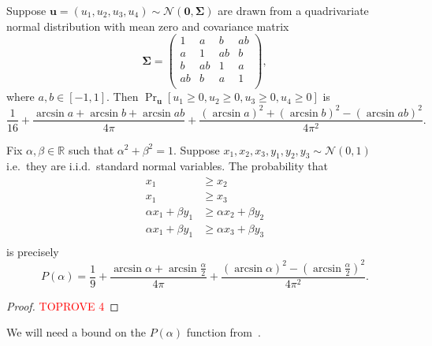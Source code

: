 \documentclass[a4paper,11pt, DIV=11]{scrartcl}
\theoremstyle{plain}
\theoremstyle{definition}
\begin{document}
\begin{theorem}\label{thm:cheng}
Suppose $\mathbf{u} = (u_1, u_2, u_3, u_4) \sim \mathcal{N}(\mathbf{0}, \mathbf{\Sigma})$ are drawn from a quadrivariate normal distribution with mean zero and covariance matrix
\[
\mathbf{\Sigma} =
\begin{pmatrix}
   1 & a & b & ab \\
   a & 1 & ab & b \\
   b & ab & 1 & a \\
   ab & b & a & 1 \\
\end{pmatrix},
\]
where $a, b \in [-1, 1]$. Then $\Pr_{\mathbf{u}}[u_1 \geq 0, u_2 \geq 0, u_3 \geq 0, u_4 \geq 0]$ is 
\[
\frac{1}{16} + \frac{\arcsin a + \arcsin b + \arcsin ab}{4\pi} + \frac{{(\arcsin a)}^2 + {(\arcsin b)}^2 - {(\arcsin ab)}^2}{4\pi^2}.
\]
\end{theorem}

\begin{lemma}\label{lem:prExpr}
Fix $\alpha, \beta \in \mathbb{R}$ such that $\alpha^2 + \beta^2 = 1$. Suppose $x_1, x_2, x_3, y_1, y_2, y_3 \sim \mathcal{N}(0, 1)$ i.e.~they are i.i.d.~standard normal variables. The probability that
\begin{align*}
x_1 & \geq x_2 \\
x_1 & \geq x_3 \\
\alpha x_1 + \beta y_1 & \geq  \alpha x_2 + \beta y_2 \\
\alpha x_1 + \beta y_1 & \geq  \alpha x_3 + \beta y_3 \\
\end{align*}
is precisely
\[
P(\alpha) = 
\frac{1}{9}
+ \frac{\arcsin \alpha + \arcsin \frac{\alpha}{2}}{4\pi} 
+ \frac{
{(\arcsin \alpha)}^2-
{(\arcsin \frac{\alpha}{2})}^2
}{4\pi^2}.
\]
\end{lemma}
\begin{proof}\textcolor{red}{TOPROVE 4}\end{proof}

We will need a bound on the $P(\alpha)$ function from~.
\end{document}
